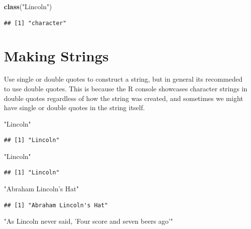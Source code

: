 \documentclass[
]{book}
\newenvironment{Shaded}{\begin{snugshade}}{\end{snugshade}}
\newcommand{\KeywordTok}[1]{\textcolor[rgb]{0.13,0.29,0.53}{\textbf{#1}}}
\newcommand{\NormalTok}[1]{#1}
\newcommand{\StringTok}[1]{\textcolor[rgb]{0.31,0.60,0.02}{#1}}
\begin{document}
\begin{Shaded}
\begin{Highlighting}[]
\KeywordTok{class}\NormalTok{(}\StringTok{"Lincoln"}\NormalTok{)}
\end{Highlighting}
\end{Shaded}

\begin{verbatim}
## [1] "character"
\end{verbatim}

\hypertarget{making-strings}{%
\section{Making Strings}\label{making-strings}}

Use single or double quotes to construct a string, but in general its recommeded to use double quotes. This is because the R console showcases character strings in double quotes regardless of how the string was created, and sometimes we might have single or double quotes in the string itself.

\begin{Shaded}
\begin{Highlighting}[]
\StringTok{"Lincoln"}
\end{Highlighting}
\end{Shaded}

\begin{verbatim}
## [1] "Lincoln"
\end{verbatim}

\begin{Shaded}
\begin{Highlighting}[]
\StringTok{"Lincoln"}
\end{Highlighting}
\end{Shaded}

\begin{verbatim}
## [1] "Lincoln"
\end{verbatim}

\begin{Shaded}
\begin{Highlighting}[]
\StringTok{"Abraham Lincoln's Hat"}
\end{Highlighting}
\end{Shaded}

\begin{verbatim}
## [1] "Abraham Lincoln's Hat"
\end{verbatim}

\begin{Shaded}
\begin{Highlighting}[]
\StringTok{"As Lincoln never said, 'Four score and seven beers ago'"}
\end{Highlighting}
\end{Shaded}
\end{document}
